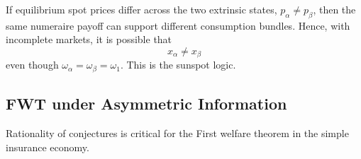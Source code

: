 If equilibrium spot prices differ across the two extrinsic states, \(p_\alpha\neq p_\beta\),
then the same numeraire payoff can support different consumption bundles. Hence,
with incomplete markets, it is possible that
\[
x_\alpha\neq x_\beta
\]
even though \(\omega_\alpha=\omega_\beta=\omega_1\).
This is the sunspot logic.


\subsection{FWT under Asymmetric Information}
Rationality of conjectures is critical for the First welfare theorem in the simple insurance economy. 